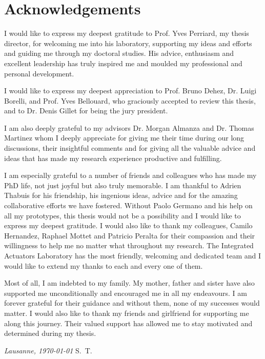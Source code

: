 \chapter*{Acknowledgements}
I would like to express my deepest gratitude to Prof. Yves Perriard, my thesis director, for welcoming me into his laboratory, supporting my ideas and efforts and guiding me through my doctoral studies. His advice, enthusiasm and excellent leadership has truly inspired me and moulded my professional and personal development.

I would like to express my deepest appreciation to Prof. Bruno Dehez, Dr. Luigi Borelli, and Prof. Yves Bellouard, who graciously accepted to review this thesis, and to Dr. Denis Gillet for being the jury president.

I am also deeply grateful to my advisors Dr. Morgan Almanza and Dr. Thomas Martinez whom I deeply appreciate for giving me their time during our long discussions, their insightful comments and for giving all the valuable advice and ideas that has made my research experience productive and fulfilling.

I am especially grateful to a number of friends and colleagues who has made my PhD life, not just joyful but also truly memorable. I am thankful to Adrien Thabuis for his friendship, his ingenious ideas, advice and for the amazing collaborative efforts we have fostered. Without Paolo Germano and his help on all my prototypes, this thesis would not be a possibility and I would like to express my deepest gratitude. I would also like to thank my colleagues, Camilo Hernandez, Raphael Mottet and Patricio Peralta for their compassion and their willingness to help me no matter what throughout my research. The Integrated Actuators Laboratory has the most friendly, welcoming and dedicated team and I would like to extend my thanks to each and every one of them.

Most of all, I am indebted to my family. My mother, father and sister have also supported me unconditionally and encouraged me in all my endeavours. I am forever grateful for their guidance and without them, none of my successes would matter. I would also like to thank my friends and girlfriend for supporting me along this journey. Their valued support has allowed me to stay motivated and determined during my thesis.
\bigskip

\noindent\textit{Lausanne, \today}
\hfill S.~T.
